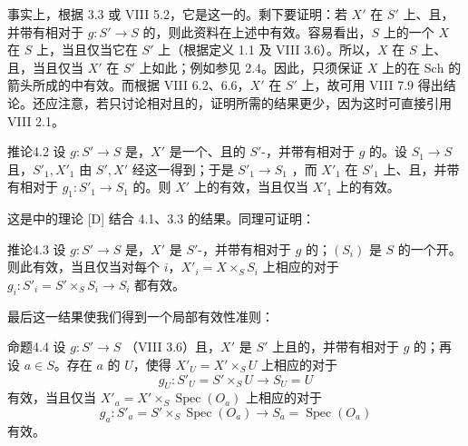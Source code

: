 事实上，根据 3.3 或 VIII 5.2，它是这一的。剩下要证明：若 $X'$ 在 $S'$ 上、且，并带有相对于 $g:S'\to S$ 的，则此资料在上述中有效。容易看出，$S$ 上的一个 $X$ 在 $S$ 上，当且仅当它在 $S'$ 上（根据定义 1.1 及 VIII 3.6）。所以，$X$ 在 $S$ 上、且，当且仅当 $X'$ 在 $S'$ 上如此；例如参见 2.4。因此，只须保证 $X$ 上的在 $\mathrm{Sch}$ 的箭头所成的中有效。而根据 VIII 6.2、6.6，$X'$ 在 $S'$ 上，故可用 VIII 7.9 得出结论。还应注意，若只讨论相对且的，证明所需的结果更少，因为这时可直接引用 VIII 2.1。
\begin{SGAresult}{推论}{4.2}
设 $g:S'\to S$ 是，$X'$ 是一个、且的 $S'$-，并带有相对于 $g$ 的。设 $S_1\to S$ 且，$S'_1,X'_1$ 由 $S',X'$ 经这一得到；于是 $S'_1\to S_1$ ，而 $X'_1$ 在 $S'_1$ 上、且，并带有相对于 $g_1:S'_1\to S_1$ 的。则 $X'$ 上的有效，当且仅当 $X'_1$ 上的有效。
\end{SGAresult}
这是中的理论 [D] 结合 4.1、3.3 的结果。同理可证明：
\begin{SGAresult}{推论}{4.3}
设 $g:S'\to S$ 是，$X'$ 是 $S'$-，并带有相对于 $g$ 的；$(S_i)$ 是 $S$ 的一个开。则此有效，当且仅当对每个 $i$，$X'_i=X\times_S S_i$ 上相应的对于 $g_i:S'_i=S'\times_S S_i\to S_i$ 都有效。
\end{SGAresult}
最后这一结果使我们得到一个局部有效性准则：
\begin{SGAresult}{命题}{4.4}
设 $g:S'\to S$ （VIII 3.6）且，$X'$ 是 $S'$ 上且的，并带有相对于 $g$ 的；再设 $a\in S$。存在 $a$ 的 $U$，使得 $X'_U=X'\times_S U$ 上相应的对于
\[
g_U:S'_U=S'\times_S U\longrightarrow S_U=U
\]
有效，当且仅当 $X'_a=X'\times_S\operatorname{Spec}(O_a)$ 上相应的对于
\[
g_a:S'_a=S'\times_S\operatorname{Spec}(O_a)\longrightarrow S_a=\operatorname{Spec}(O_a)
\]
有效。
\end{SGAresult}

